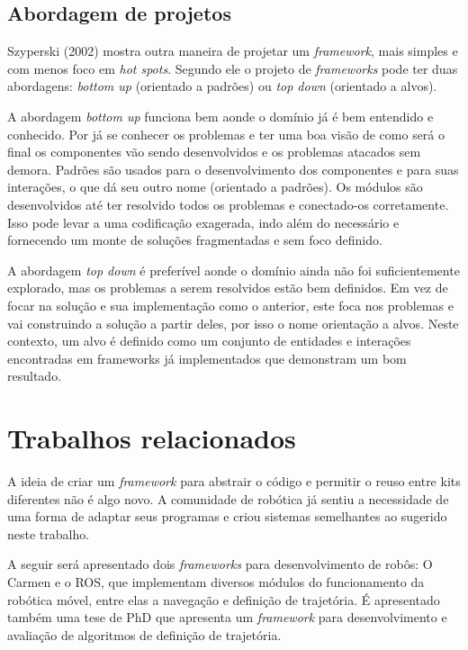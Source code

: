 \subsection{Abordagem de projetos}

Szyperski (2002) mostra outra maneira de projetar um \textit{framework}, mais simples e com menos foco em \textit{hot spots}. Segundo ele o projeto de \textit{frameworks} pode ter duas abordagens: \textit{bottom up} (orientado a padrões) ou \textit{top down} (orientado a alvos).

A abordagem \textit{bottom up} funciona bem aonde o domínio já é bem entendido e conhecido. Por já se conhecer os problemas e ter uma boa visão de como será o final os componentes vão sendo desenvolvidos e os problemas atacados sem demora. Padrões são usados para o desenvolvimento dos componentes e para suas interações, o que dá seu outro nome (orientado a padrões). Os módulos são desenvolvidos até ter resolvido todos os problemas e conectado-os corretamente. Isso pode levar a uma codificação exagerada, indo além do necessário e fornecendo um monte de soluções fragmentadas e sem foco definido.

A abordagem \textit{top down} é preferível aonde o domínio ainda não foi suficientemente explorado, mas os problemas a serem resolvidos estão bem definidos. Em vez de focar na solução e sua implementação como o anterior, este foca nos problemas e vai construindo a solução a partir deles, por isso o nome orientação a alvos. Neste contexto, um alvo é definido como um conjunto de entidades e interações encontradas em frameworks já implementados que demonstram um bom resultado.

\section{Trabalhos relacionados}

A ideia de criar um \textit{framework} para abstrair o código e permitir o reuso entre kits diferentes não é algo novo. A comunidade de robótica já sentiu a necessidade de uma forma de adaptar seus programas e criou sistemas semelhantes ao sugerido neste trabalho.

A seguir será apresentado dois \textit{frameworks} para desenvolvimento de robôs: O Carmen e o ROS, que implementam diversos módulos do funcionamento da robótica móvel, entre elas a navegação e definição de trajetória. É apresentado também uma tese de PhD que apresenta um \textit{framework} para desenvolvimento e avaliação de algoritmos de definição de trajetória.


